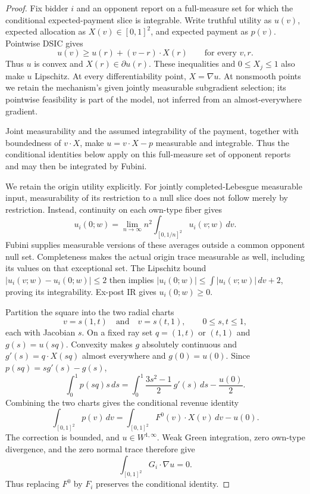 \begin{proof}
Fix bidder \(i\) and an opponent report on a full-measure set for which the
conditional expected-payment slice is integrable.  Write truthful utility as
\(u(v)\), expected allocation as \(X(v)\in[0,1]^2\), and expected payment as
\(p(v)\).  Pointwise DSIC gives
\[
u(v)\geq u(r)+(v-r)\cdot X(r)\qquad\text{for every }v,r.
\]
Thus \(u\) is convex and \(X(r)\in\partial u(r)\).  These inequalities and
\(0\leq X_j\leq1\) also make \(u\) Lipschitz.  At every differentiability
point, \(X=\nabla u\).  At nonsmooth points we retain the mechanism's given
jointly measurable subgradient selection; its pointwise feasibility is part
of the model, not inferred from an almost-everywhere gradient.

Joint measurability and the assumed integrability of the payment, together
with boundedness of \(v\cdot X\), make \(u=v\cdot X-p\) measurable and
integrable.  Thus the conditional identities below apply on this full-measure
set of opponent reports and may then be integrated by Fubini.

We retain the origin utility explicitly. For jointly completed-Lebesgue
measurable input, measurability of its restriction to a null slice does not
follow merely by restriction. Instead, continuity on each own-type fiber gives
\[
 u_i(0;w)=\lim_{n\to\infty}
 n^2\int_{[0,1/n]^2}u_i(v;w)\,dv.
\]
Fubini supplies measurable versions of these averages outside a common
opponent null set. Completeness makes the actual origin trace measurable
as well, including its values on that exceptional set. The Lipschitz bound
$|u_i(v;w)-u_i(0;w)|\le2$ then implies
$|u_i(0;w)|\le\int|u_i(v;w)|\,dv+2$, proving its integrability.
Ex-post IR gives $u_i(0;w)\ge0$.

Partition the square into the two radial charts
\[
v=s(1,t)\quad\text{and}\quad v=s(t,1),
\qquad 0\leq s,t\leq1,
\]
each with Jacobian \(s\).  On a fixed ray set \(q=(1,t)\) or \((t,1)\) and
\(g(s)=u(sq)\).  Convexity makes \(g\) absolutely continuous and
\(g'(s)=q\cdot X(sq)\) almost everywhere and \(g(0)=u(0)\).  Since
\(p(sq)=s g'(s)-g(s)\),
\[
\int_0^1p(sq)s\,ds
=\int_0^1\frac{3s^2-1}{2}\,g'(s)\,ds-\frac{u(0)}2.
\]
Combining the two charts gives the conditional revenue identity
\[
\int_{[0,1]^2}p(v)\,dv
=\int_{[0,1]^2}F^0(v)\cdot X(v)\,dv-u(0).
\]
The correction is bounded, and \(u\in W^{1,\infty}\).  Weak Green integration,
zero own-type divergence, and the zero normal trace therefore give
\[
\int_{[0,1]^2}G_i\cdot\nabla u=0.
\]
Thus replacing \(F^0\) by \(F_i\) preserves the conditional identity.


\end{proof}
